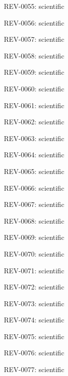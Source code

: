 \documentclass[10pt,openany]{book}
\begin{document}
\noindent REV-0055:  scientific\par

\noindent REV-0056:  scientific\par

\noindent REV-0057:  scientific\par

\noindent REV-0058:  scientific\par

\noindent REV-0059:  scientific\par

\noindent REV-0060:  scientific\par

\noindent REV-0061:  scientific\par

\noindent REV-0062:  scientific\par

\noindent REV-0063:  scientific\par

\noindent REV-0064:  scientific\par

\noindent REV-0065:  scientific\par

\noindent REV-0066:  scientific\par

\noindent REV-0067:  scientific\par

\noindent REV-0068:  scientific\par

\noindent REV-0069:  scientific\par

\noindent REV-0070:  scientific\par

\noindent REV-0071:  scientific\par

\noindent REV-0072:  scientific\par

\noindent REV-0073:  scientific\par

\noindent REV-0074:  scientific\par

\noindent REV-0075:  scientific\par

\noindent REV-0076:  scientific\par

\noindent REV-0077:  scientific\par
\end{document}
